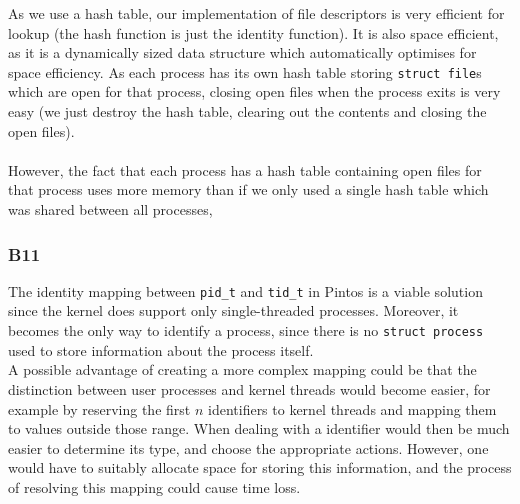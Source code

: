 \documentclass[a4wide, 11pt]{article}
\newcommand{\tx}{\texttt}
\begin{document}
As we use a hash table, our implementation of file descriptors is very efficient for lookup (the hash function is just the identity function). It is also space efficient, as it is a dynamically sized data structure which automatically optimises for space efficiency. As each process has its own hash table storing \tx{struct file}s which are open for that process, closing open files when the process exits is very easy (we just destroy the hash table, clearing out the contents and closing the open files).
\\\\
However, the fact that each process has a hash table containing open files for that process uses more memory than if we only used a single hash table which was shared between all processes, \\


\subsubsection{B11}
The identity mapping between \tx{pid\_t} and \tx{tid\_t} in Pintos is a viable solution since the kernel does support only single-threaded processes. Moreover, it becomes the only way to identify a process, since there is no \tx{struct process} used to store information about the process itself. 
\\ A possible advantage of creating a more complex mapping could be that the distinction between user processes and kernel threads would become easier, for example by reserving the first $n$ identifiers to kernel threads and mapping them to values outside those range. When dealing with a identifier would then be much easier to determine its type, and choose the appropriate actions. However, one would have to suitably allocate space for storing this information, and the process of resolving this mapping could cause time loss.  
\end{document}

